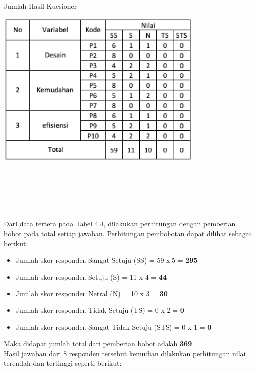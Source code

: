 \begin{flushleft}
\begin{justify}
        \begin{table}[ht]
            \centering
            \caption{Jumlah Hasil Kuesioner}
            \includegraphics[width=10cm]{images/bab 4/hitungan.png}\\
            \end{table}
            \newline \noindent \\\\\\\\
            \vspace{5cm}
            \noindent \\Dari data tertera pada Tabel 4.4, dilakukan perhitungan dengan pemberian bobot pada total setiap jawaban.
            Perhitungan pembobotan dapat dilihat sebagai berikut:
            \begin{itemize}
                \item Jumlah skor responden Sangat Setuju (SS) = 59 x 5 = \textbf{295}
                \item Jumlah skor responden Setuju (S)  = 11 x 4 = \textbf{44}
                \item Jumlah skor responden Netral (N)  = 10 x 3 = \textbf{30}
                \item Jumlah skor responden Tidak Setuju (TS)  = 0 x 2 = \textbf{0}
                \item Jumlah skor responden Sangat Tidak Setuju (STS)  = 0 x 1 = \textbf{0}
            \end{itemize}
            Maka didapat jumlah total dari pemberian bobot adalah \textbf{369}\\
            Hasil jawaban dari 8 responden tersebut kemudian dilakukan perhitungan nilai terendah dan tertinggi seperti berikut:
            \begin{itemize}

\end{itemize}
\end{justify}
\end{flushleft}
